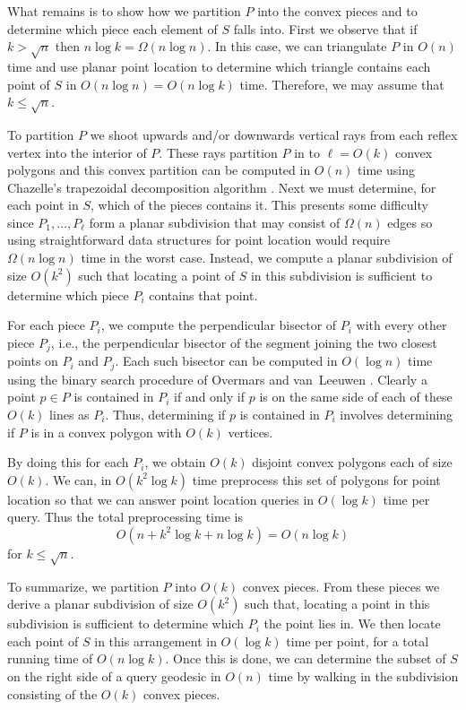 \documentclass[charterfonts,lotsofwhite]{patmorin}
\begin{document}
What remains is to show how we partition $P$ into the convex pieces
and to determine which piece each element of $S$ falls into.  First we
observe that if $k>\sqrt{n}$ then $n\log k=\Omega(n\log n)$.  In this
case, we can triangulate $P$ in $O(n)$ time and use planar point
location to determine which triangle contains each point of $S$ in
$O(n\log n)=O(n\log k)$ time.  Therefore, we may assume that $k\le
\sqrt{n}$.

To partition $P$ we shoot upwards and/or downwards vertical rays from
each reflex vertex into the interior of $P$. These rays partition $P$
in to $\ell=O(k)$ convex polygons and this convex partition can be
computed in $O(n)$ time using Chazelle's trapezoidal decomposition
algorithm \cite{c91}.  Next we must determine, for each point in $S$,
which of the pieces contains it.  This presents some difficulty since
$P_1,\ldots,P_\ell$ form a planar subdivision that may consist of
$\Omega(n)$ edges so using straightforward data structures for point
location would require $\Omega(n\log n)$ time in the worst case.
Instead, we compute a planar subdivision of size $O(k^2)$ such that
locating a point of $S$ in this subdivision is sufficient to determine
which piece $P_i$ contains that point.  

For each piece $P_i$, we compute the perpendicular bisector of $P_i$
with every other piece $P_j$, i.e., the perpendicular bisector of the
segment joining the two closest points on $P_i$ and $P_j$.  Each such
bisector can be computed in $O(\log n)$ time using the binary search
procedure of Overmars and van~Leeuwen \cite{ov81}.  Clearly a point
$p\in P$ is contained in $P_i$ if and only if $p$ is on the same side
of each of these $O(k)$ lines as $P_i$.  Thus, determining if $p$ is
contained in $P_i$ involves determining if $P$ is in a convex polygon
with $O(k)$ vertices.

By doing this for each $P_i$, we obtain $O(k)$ disjoint convex
polygons each of size $O(k)$.  We can, in $O(k^2\log k)$ time
preprocess this set of polygons for point location so that we can
answer point location queries in $O(\log k)$ time per query.  Thus the
total preprocessing time is 
\[ O(n+k^2\log k + n\log k)= O(n\log k) \]
for $k\le \sqrt{n}$.

To summarize, we partition $P$ into $O(k)$ convex pieces.  From these
pieces we derive a planar subdivision of size $O(k^2)$ such that,
locating a point in this subdivision is sufficient to determine which
$P_i$ the point lies in.  We then locate each point of $S$ in this
arrangement in $O(\log k)$ time per point, for a total running time of
$O(n\log k)$.  Once this is done, we can determine the subset of $S$
on the right side of a query geodesic in $O(n)$ time by walking in the
subdivision consisting of the $O(k)$ convex pieces. 
\end{document}
